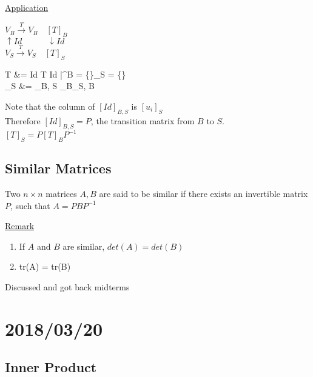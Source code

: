 \documentclass[12pt]{article}
\newenvironment{block}[1][Label]{\underline{#1}\par}{}
\newenvironment{remark}{\block[Remark]}{\endblock}
\newcommand{\bb}[1]{\left\{#1\right\}}
\newcommand{\bbb}[1]{\left[#1\right]}
\newenvironment{eqn}{\equation\alignedat{3}}{\endalignedat\endequation}
\begin{document}
	\pagebreak

	\begin{block}[Application]
		$V_B \xrightarrow{T} V_B \quad \bbb{T}_B$ \\
		$\uparrow Id \quad \quad \quad \downarrow Id$ \\
		$V_S \xrightarrow{T} V_S \quad \bbb{T}_S$
		
		\begin{eqn}
			T &= Id \circ T \circ Id \quad \big|^{B = \bb{\vv}}_{S = \bb{\vv[base=v]}} \\
			\bbb{T}_S &= \bbb{Id}_{B, S} \bbb{T}_B\bbb{Id}_{S, B}
		\end{eqn}
	
		Note that the column of $\bbb{Id}_{B, S}$ is $\bbb{u_i}_S$ \\
		Therefore $\bbb{Id}_{B, S} = P$, the transition matrix from $B$ to $S$. \\
		$\bbb{T}_S = P \bbb{T}_B P^{-1}$
	\end{block}
	
	\subsection{Similar Matrices}
	
	Two $n \times n$ matrices $A, B$ are said to be similar if there exists an invertible matrix $P$, such that $A = PBP^{-1}$
	
	\begin{remark}
		\begin{enumerate}
			\item If $A$ and $B$ are similar, $det(A) = det(B)$
			\item tr(A) = tr(B)
		\end{enumerate}
	\end{remark}

	Discussed and got back midterms
	
	\section{2018/03/20}
	
	\subsection{Inner Product}
	
\end{document}
